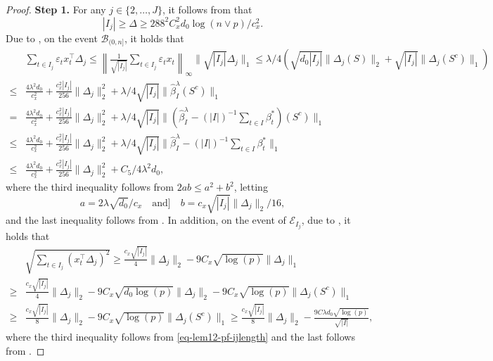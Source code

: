 \documentclass[twoside]{article}
\begin{document}
\begin{proof}
\vskip 3mm
\noindent \textbf{Step 1.}  For any $j \in \{2, \ldots, J\}$, it follows from  that
	\begin{equation} \label{eq-lem12-pf-ijlength}
		|I_j| \geq \Delta \geq 288^2 C^2_x d_0 \log(n \vee p)/c_x^2.
	\end{equation}
	Due to , on the event $\mathcal{B}_{(0, n]}$, it holds that	
	\begin{align}  
		& \sum_{t\in I_j} \varepsilon_t x_t^{\top} \Delta_j \leq \left\|\frac{1}{\sqrt{|I_j|}}  \sum_{t\in I_j } \varepsilon_t x_t \right\|_{\infty} \| \sqrt { | I_j| } \Delta_j\|_1  \leq \lambda/4 \left(\sqrt{d_0 |I_j|}\|\Delta_j(S)\|_2 + \sqrt{|I_j|} \|\Delta_j(S^c)\|_1\right) \nonumber  \\
		\leq & \frac{4\lambda^2 d_0}{c_x^2} + \frac{c_x^2|I_j|}{256} \|\Delta_j\|_2^2  + \lambda/4 \sqrt {|I_j|} \|\widehat \beta^\lambda_{I}(S^c)\|_1 \nonumber \\
		= & \frac{4\lambda^2 d_0}{c_x^2} + \frac{c_x^2|I_j|}{256} \|\Delta_j\|_2^2  + \lambda/4 \sqrt {|I_j|} \|(\widehat \beta^\lambda_{I} - (|I|)^{-1}\sum_{t\in I}\beta^*_t)(S^c)\|_1 \nonumber \\
		\leq & \frac{4\lambda^2 d_0}{c_x^2} + \frac{c_x^2|I_j|}{256} \|\Delta_j\|_2^2  + \lambda/4 \sqrt {|I_j|} \|\widehat \beta^\lambda_{I} - (|I|)^{-1}\sum_{t\in I}\beta^*_t\|_1 \nonumber \\
		\leq & \frac{4\lambda^2 d_0}{c_x^2} + \frac{c_x^2|I_j|}{256} \|\Delta_j\|_2^2 + C_5/4 \lambda^2 d_0, \label{eq:three change points standard equality 1}
	\end{align}
	where the third inequality follows from $2ab \leq a^2 + b^2$, letting
	\[
		a = 2\lambda\sqrt{d_0}/c_x \quad \mbox{and} ]\quad b = c_x\sqrt{|I_j|}\|\Delta_j\|_2/16,
	\] 
	and the last inequality follows from .  In addition, on the event of $\mathcal{E}_{I_j}$, due to , it holds that 
	\begin{align}
		& \sqrt{\sum_{t\in I_j} (x_t^{\top} \Delta_j)^2} \geq \frac{c_x\sqrt{|I_j|}}{4} \|\Delta_j\|_2 - 9C_x \sqrt{\log(p)} \|\Delta_j\|_1 \nonumber \\
		\geq & \frac{c_x\sqrt{|I_j|}}{4} \|\Delta_j\|_2 - 9C_x \sqrt{d_0 \log(p)} \|\Delta_j\|_2 - 9C_x \sqrt{\log(p)} \|\Delta_j(S^c)\|_1 \nonumber \\
		\geq & \frac{c_x\sqrt{|I_j|}}{8} \|\Delta_j\|_2 - 9C_x \sqrt{\log(p)} \|\Delta_j(S^c)\|_1 \geq \frac{c_x \sqrt{|I_j|}}{8} \|\Delta_j\|_2 - \frac{9 C \lambda d_0 \sqrt{\log(p)}}{\sqrt{|I|}}, \label{eq:REC three change}
	\end{align}
	where the third inequality follows from \eqref{eq-lem12-pf-ijlength} and the last follows from .


\end{proof}
\end{document}
